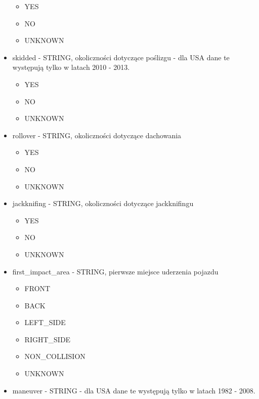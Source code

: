 \begin{itemize}
  \begin{itemize}
  \itemsep1pt\parskip0pt
  \item
    YES\\
  \item
    NO\\
  \item
    UNKNOWN\\
  \end{itemize}
\item
  skidded - STRING, okoliczności dotyczące poślizgu - dla USA dane te
  występują tylko w latach 2010 - 2013.

  \begin{itemize}
  \itemsep1pt\parskip0pt
  \item
    YES\\
  \item
    NO\\
  \item
    UNKNOWN\\
  \end{itemize}
\item
  rollover - STRING, okoliczności dotyczące dachowania

  \begin{itemize}
  \itemsep1pt\parskip0pt
  \item
    YES\\
  \item
    NO\\
  \item
    UNKNOWN\\
  \end{itemize}
\item
  jackknifing - STRING, okoliczności dotyczące jackknifingu

  \begin{itemize}
  \itemsep1pt\parskip0pt
  \item
    YES\\
  \item
    NO\\
  \item
    UNKNOWN\\
  \end{itemize}
\item
  first\_impact\_area - STRING, pierwsze miejsce uderzenia pojazdu

  \begin{itemize}
  \itemsep1pt\parskip0pt
  \item
    FRONT\\
  \item
    BACK\\
  \item
    LEFT\_SIDE\\
  \item
    RIGHT\_SIDE\\
  \item
    NON\_COLLISION\\
  \item
    UNKNOWN\\
  \end{itemize}
\item
  maneuver - STRING - dla USA dane te występują tylko w latach 1982 -
  2008.


\end{itemize}
